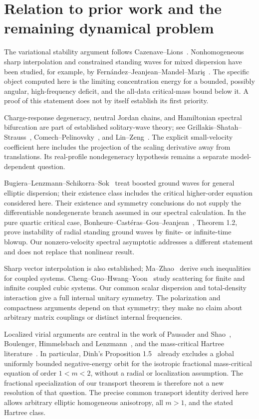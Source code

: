 \documentclass[11pt,a4paper]{article}
\theoremstyle{remark}\newtheorem{remark}[theorem]{Remark}
\begin{document}
\section{Relation to prior work and the remaining dynamical problem}
The variational stability argument follows Cazenave--Lions~\cite{CL}.
Nonhomogeneous sharp interpolation and constrained standing waves for
mixed dispersion have been studied, for example, by
Fern\'andez--Jeanjean--Mandel--Mari\c{s}~\cite{FJMM}.
The specific object computed here is the limiting concentration energy
for a bounded, possibly angular, high-frequency deficit, and the
all-data critical-mass bound below it. A proof of this statement does
not by itself establish its first priority.

Charge-response degeneracy, neutral Jordan chains, and Hamiltonian
spectral bifurcation are part of established solitary-wave theory;
see Grillakis--Shatah--Strauss~\cite{GSS},
Comech--Pelinovsky~\cite{CP}, and Lin--Zeng~\cite{LZ}.
The explicit small-velocity coefficient here includes the projection of
the scaling derivative away from translations. Its real-profile
nondegeneracy hypothesis remains a separate model-dependent question.

Bugiera--Lenzmann--Schikorra--Sok~\cite{BLSS} treat boosted ground
waves for general elliptic dispersion; their existence class includes
the critical higher-order equation considered here. Their existence
and symmetry conclusions do not supply the differentiable nondegenerate
branch assumed in our spectral calculation. In the pure quartic critical
case, Bonheure--Cast\'eras--Gou--Jeanjean~\cite{BCGJinst}, Theorem 1.2,
prove instability of radial standing ground waves by finite- or
infinite-time blowup. Our nonzero-velocity spectral asymptotic addresses
a different statement and does not replace that nonlinear result.

Sharp vector interpolation is also established; Ma--Zhao~\cite{MZ}
derive such inequalities for coupled systems.
Cheng--Guo--Hwang--Yoon~\cite{CGHY} study scattering for finite and
infinite coupled cubic systems. Our common scalar dispersion and
total-density interaction give a full internal unitary symmetry.
The polarization and compactness arguments depend on that symmetry;
they make no claim about arbitrary matrix couplings or distinct internal
frequencies.

Localized virial arguments are central in the work of
Pausader and Shao~\cite{PS}, Boulenger, Himmelsbach and Lenzmann~\cite{BHL},
and the mass-critical Hartree literature~\cite{CHKL}.
In particular, Dinh's Proposition 1.5~\cite{Dinh} already excludes a
global uniformly bounded negative-energy orbit for the isotropic
fractional mass-critical equation of order $1<m<2$, without a radial
or localization assumption. The fractional specialization of our
transport theorem is therefore not a new resolution of that question.
The precise common transport identity derived here allows arbitrary
elliptic homogeneous anisotropy, all $m>1$, and the stated Hartree class.
\end{document}
